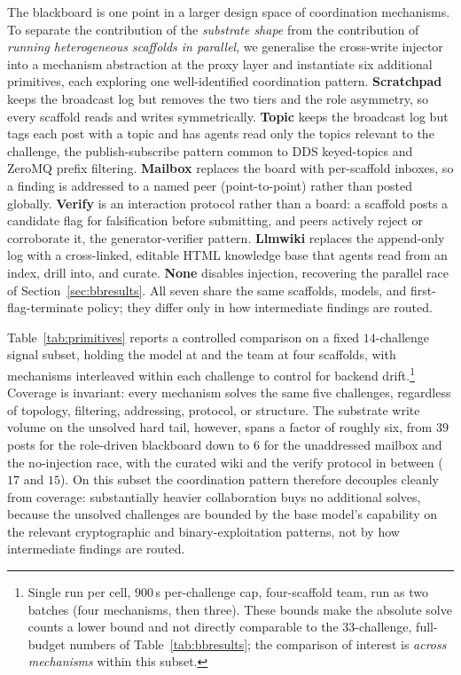 The blackboard is one point in a larger design space of coordination mechanisms. To separate the contribution of the \emph{substrate shape} from the contribution of \emph{running heterogeneous scaffolds in parallel}, we generalise the cross-write injector into a mechanism abstraction at the proxy layer and instantiate six additional primitives, each exploring one well-identified coordination pattern. \textbf{Scratchpad} keeps the broadcast log but removes the two tiers and the role asymmetry, so every scaffold reads and writes symmetrically. \textbf{Topic} keeps the broadcast log but tags each post with a topic and has agents read only the topics relevant to the challenge, the publish-subscribe pattern common to DDS keyed-topics and ZeroMQ prefix filtering. \textbf{Mailbox} replaces the board with per-scaffold inboxes, so a finding is addressed to a named peer (point-to-point) rather than posted globally. \textbf{Verify} is an interaction protocol rather than a board: a scaffold posts a candidate flag for falsification before submitting, and peers actively reject or corroborate it, the generator-verifier pattern. \textbf{Llmwiki} replaces the append-only log with a cross-linked, editable HTML knowledge base that agents read from an index, drill into, and curate. \textbf{None} disables injection, recovering the parallel race of Section~\ref{sec:bbresults}. All seven share the same scaffolds, models, and first-flag-terminate policy; they differ only in how intermediate findings are routed.

Table~\ref{tab:primitives} reports a controlled comparison on a fixed $14$-challenge signal subset, holding the model at \aliasmini{} and the team at four scaffolds, with mechanisms interleaved within each challenge to control for backend drift.\footnote{Single run per cell, $900$\,s per-challenge cap, four-scaffold team, run as two batches (four mechanisms, then three). These bounds make the absolute solve counts a lower bound and not directly comparable to the $33$-challenge, full-budget numbers of Table~\ref{tab:bbresults}; the comparison of interest is \emph{across mechanisms} within this subset.} Coverage is invariant: every mechanism solves the same five challenges, regardless of topology, filtering, addressing, protocol, or structure. The substrate write volume on the unsolved hard tail, however, spans a factor of roughly six, from $39$ posts for the role-driven blackboard down to $6$ for the unaddressed mailbox and the no-injection race, with the curated wiki and the verify protocol in between ($17$ and $15$). On this subset the coordination pattern therefore decouples cleanly from coverage: substantially heavier collaboration buys no additional solves, because the unsolved challenges are bounded by the base model's capability on the relevant cryptographic and binary-exploitation patterns, not by how intermediate findings are routed.

